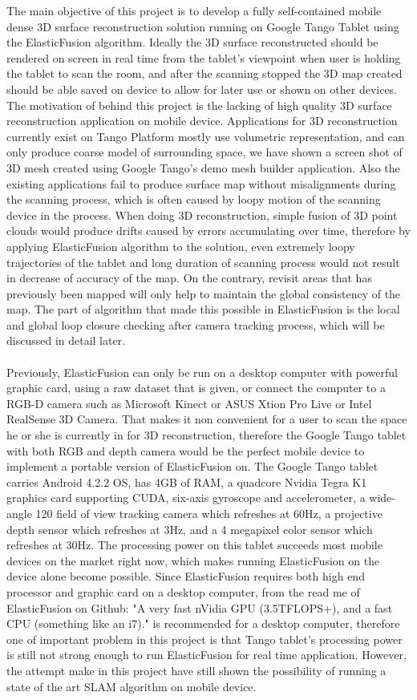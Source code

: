 \documentclass[12pt,twoside]{article}
\begin{document}
The main objective of this project is to develop a fully self-contained mobile dense 3D surface reconstruction solution running on Google Tango Tablet using the ElasticFusion algorithm. Ideally the 3D surface reconstructed should be rendered on screen in real time from the tablet's viewpoint when user is holding the tablet to scan the room, and after the scanning stopped the 3D map created should be able saved on device to allow for later use or shown on other devices. The motivation of behind this project is the lacking of high quality 3D surface reconstruction application on mobile device. Applications for 3D reconstruction currently exist on Tango Platform mostly use volumetric representation, and can only produce coarse model of surrounding space, we have shown a screen shot of 3D mesh created using Google Tango's demo mesh builder application. Also the existing applications fail to produce surface map without misalignments during the scanning process, which is often caused by loopy motion of the scanning device in the process. When doing 3D reconstruction, simple fusion of 3D point clouds would produce drifts caused by errors accumulating over time, therefore by applying ElasticFusion algorithm to the solution, even extremely loopy trajectories of the tablet and long duration of scanning process would not result in decrease of accuracy of the map. On the contrary, revisit areas that has previously been mapped will only help to maintain the global consistency of the map. The part of algorithm that made this possible in ElasticFusion is the local and   global loop closure checking after camera tracking process, which will be discussed in detail later.\\
\\
Previously, ElasticFusion can only be run on a desktop computer with powerful graphic card, using a raw dataset that is given, or connect the computer to a RGB-D camera such as Microsoft Kinect or ASUS
Xtion Pro Live or Intel RealSense 3D Camera. That makes it non convenient for a user to scan the space he or she is currently in for 3D reconstruction, therefore the Google Tango tablet with both RGB and depth camera would be the perfect mobile device to implement a portable version of ElasticFusion on. The Google Tango tablet carries Android 4.2.2 OS, has 4GB of RAM, a quadcore Nvidia Tegra K1 graphics card supporting CUDA, six-axis gyroscope and accelerometer, a wide-angle 120 field of view tracking camera which refreshes at 60Hz, a projective depth sensor which refreshes at 3Hz, and a 4 megapixel color sensor which refreshes at 30Hz. The processing power on this tablet succeeds most mobile devices on the market right now, which makes running ElasticFusion on the device alone become possible. Since ElasticFusion requires both high end processor and graphic card on a desktop computer, from the read me of ElasticFusion on Github: "A very fast nVidia GPU (3.5TFLOPS+), and a fast CPU (something like an i7)." is recommended for a desktop computer, therefore one of important problem in this project is that Tango tablet's processing power is still not strong enough to run ElasticFusion for real time application. However, the attempt make in this project have still shown the possibility of running a state of the art SLAM  algorithm on mobile device.\\
\end{document}
